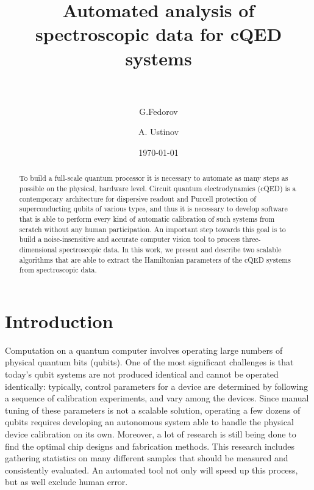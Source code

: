 \documentclass[%
 aip,
 amsmath,amssymb,
 reprint,%
]{revtex4-1}
\begin{document}

\title[Automated analysis of spectroscopic data for cQED systems]{Automated analysis of spectroscopic data for cQED systems\\~}

\author{G.Fedorov}

%
%

\author{A. Ustinov}
%
%

\date{\today}%

\begin{abstract}
To build a full-scale quantum processor it is necessary to automate as many steps as possible on the physical, hardware level. Circuit quantum electrodynamics (cQED) is a contemporary architecture for dispersive readout and Purcell protection of superconducting qubits of various types, and thus it is necessary to develop software that is able to perform every kind of automatic calibration of such systems from scratch without any human participation. An important step towards this goal is to build a noise-insensitive and accurate computer vision tool to process three-dimensional spectroscopic data. In this work, we present and describe two scalable algorithms that are able to extract the Hamiltonian parameters of the cQED systems from spectroscopic data. 
\end{abstract}

\maketitle

 \renewcommand*{\figureautorefname}{Fig.}

\section{\label{sec:level1} Introduction}

Computation on a quantum computer involves operating large numbers of physical quantum bits (qubits). One of the most significant challenges is that today’s qubit systems are not produced identical and cannot be operated identically\cite{kelly2018, chen2018}: typically, control parameters for a device are determined by following a sequence of calibration experiments, and vary among the devices. Since manual tuning of these parameters is not a scalable solution, operating a few dozens of qubits requires developing an autonomous system able to handle the physical device calibration on its own. Moreover, a lot of research is still being done to find the optimal chip designs and fabrication methods. This research includes gathering statistics on many different samples that should be measured and consistently evaluated. An automated tool not only will speed up this process, but as well exclude human error.
\end{document}
